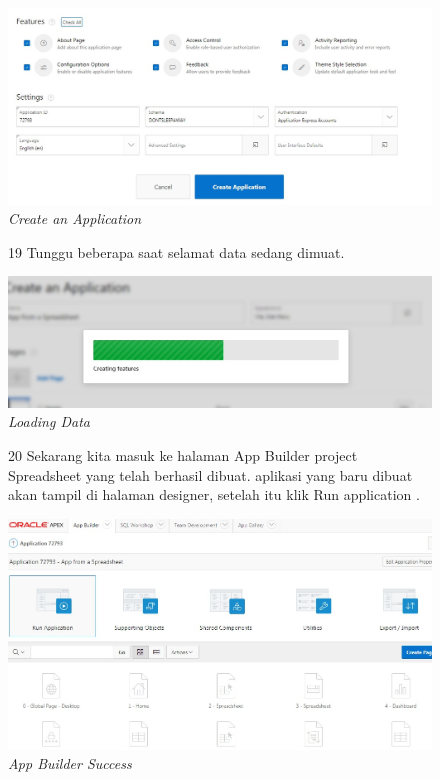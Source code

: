 \begin{enumerate}
\begin{figure}
    \begin{center}
\includegraphics[scale=0.4]{figures/create2.jpg}
    \caption{\textit{Create an Application}}
        \end{center}
\label{gambar}
\end{figure}

\begin{figure}
\item[19]Tunggu beberapa saat selamat data sedang dimuat.

    \begin{center}
\includegraphics[scale=0.4]{figures/create3.jpg}
    \caption{\textit{Loading Data}}
        \end{center}
\label{gambar}
\end{figure}

\begin{figure}
\item[20]Sekarang kita masuk ke halaman App Builder project Spreadsheet yang telah berhasil dibuat. aplikasi yang baru dibuat akan tampil di halaman designer, setelah itu klik Run application .

    \begin{center}
\includegraphics[scale=0.4]{figures/create4.jpg}
    \caption{\textit{App Builder Success}}
        \end{center}
\label{gambar}
\end{figure}


\end{enumerate}
